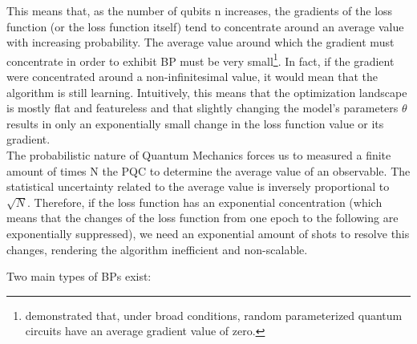 This means that, as the number of qubits n increases, the gradients of the loss function (or the loss function itself) 
tend to concentrate around an average value with increasing probability.    
The average value around which the gradient must concentrate in order to exhibit BP must be very 
small\footnote[1]{\cite{McClean_2018} demonstrated that, under broad conditions, random parameterized quantum 
circuits have an average gradient value of zero.}.
In fact, if the gradient were concentrated around a non-infinitesimal value, it would mean that the 
algorithm is still learning.
Intuitively, this means that the optimization landscape is mostly flat and featureless and
that slightly changing the model’s parameters $\theta$ results in only an exponentially small change in the loss
function value or its gradient.\\

The probabilistic nature of Quantum Mechanics forces us to measured a finite amount of times N the PQC to determine
the average value of an observable.
The statistical uncertainty related to the average value is inversely proportional to $\sqrt{N}$.
Therefore, if the loss function has an exponential concentration (which means that the changes of the loss function 
from one epoch to the following are exponentially suppressed), we need an exponential amount of shots to resolve this
changes, rendering the algorithm inefficient and non-scalable.
 

Two main types of BPs exist:


